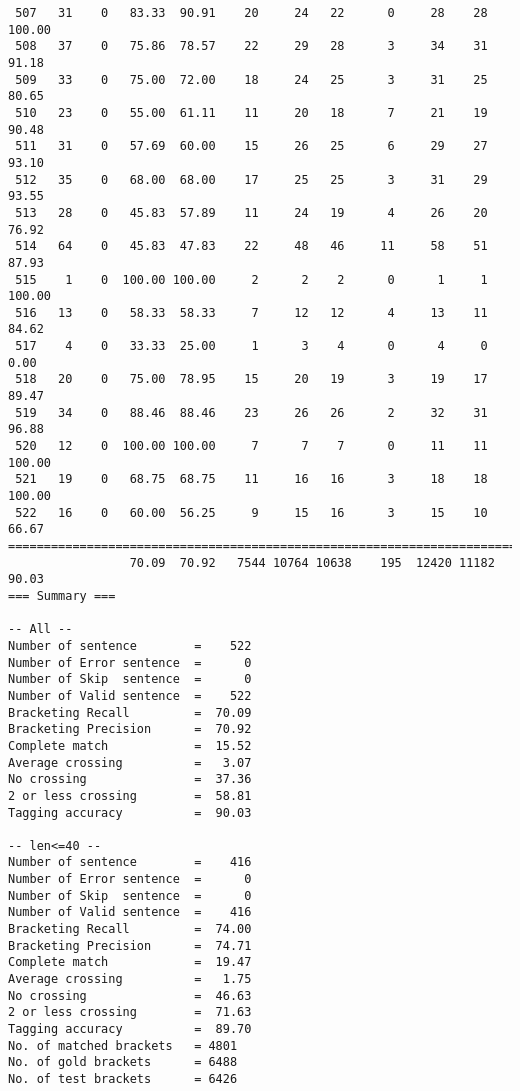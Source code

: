 \begin{verbatim}
 507   31    0   83.33  90.91    20     24   22      0     28    28   100.00
 508   37    0   75.86  78.57    22     29   28      3     34    31    91.18
 509   33    0   75.00  72.00    18     24   25      3     31    25    80.65
 510   23    0   55.00  61.11    11     20   18      7     21    19    90.48
 511   31    0   57.69  60.00    15     26   25      6     29    27    93.10
 512   35    0   68.00  68.00    17     25   25      3     31    29    93.55
 513   28    0   45.83  57.89    11     24   19      4     26    20    76.92
 514   64    0   45.83  47.83    22     48   46     11     58    51    87.93
 515    1    0  100.00 100.00     2      2    2      0      1     1   100.00
 516   13    0   58.33  58.33     7     12   12      4     13    11    84.62
 517    4    0   33.33  25.00     1      3    4      0      4     0     0.00
 518   20    0   75.00  78.95    15     20   19      3     19    17    89.47
 519   34    0   88.46  88.46    23     26   26      2     32    31    96.88
 520   12    0  100.00 100.00     7      7    7      0     11    11   100.00
 521   19    0   68.75  68.75    11     16   16      3     18    18   100.00
 522   16    0   60.00  56.25     9     15   16      3     15    10    66.67
============================================================================
                 70.09  70.92   7544 10764 10638    195  12420 11182    90.03
=== Summary ===

-- All --
Number of sentence        =    522
Number of Error sentence  =      0
Number of Skip  sentence  =      0
Number of Valid sentence  =    522
Bracketing Recall         =  70.09
Bracketing Precision      =  70.92
Complete match            =  15.52
Average crossing          =   3.07
No crossing               =  37.36
2 or less crossing        =  58.81
Tagging accuracy          =  90.03

-- len<=40 --
Number of sentence        =    416
Number of Error sentence  =      0
Number of Skip  sentence  =      0
Number of Valid sentence  =    416
Bracketing Recall         =  74.00
Bracketing Precision      =  74.71
Complete match            =  19.47
Average crossing          =   1.75
No crossing               =  46.63
2 or less crossing        =  71.63
Tagging accuracy          =  89.70
No. of matched brackets   = 4801
No. of gold brackets      = 6488
No. of test brackets      = 6426

\end{verbatim}

\normalsize

